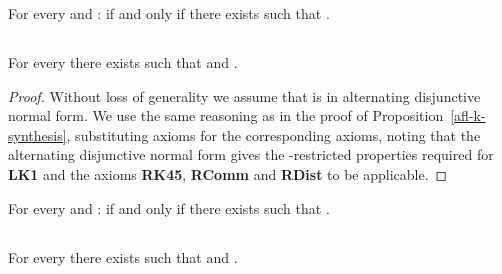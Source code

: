 \documentclass[twoside]{aiml14}
\begin{document}
  \begin{corollary}
      For every  and : 
       if and only if 
      there exists  
      such that .
  \end{corollary}

  \subsection{\classKFF{}}

  \begin{proposition}\label{afl-kff-synthesis}
      For every  there exists  such that  and .
  \end{proposition} 

  \begin{proof}
      Without loss of generality we assume that  is in alternating
      disjunctive normal form. We use the same reasoning as in the proof of
      Proposition~\ref{afl-k-synthesis}, substituting \axiomAflKFF{} axioms for
      the corresponding \axiomAflK{} axioms, noting that the alternating
      disjunctive normal form gives the -restricted properties required for {\bf LK1} and the
      \axiomRmlKFF{} axioms {\bf RK45}, {\bf RComm} and  {\bf RDist} to be
      applicable.
  \end{proof}

  \begin{corollary}
      For every  and : 
       if and only if 
      there exists  
      such that .
  \end{corollary}

  \subsection{\classS{}}

  \begin{proposition}\label{afl-s-synthesis}
      For every  there exists  such that  and .
  \end{proposition}
\end{document}
